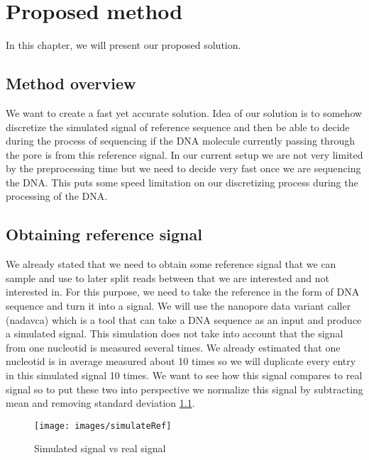 \chapter{Proposed method}

\label{kap:proposedMethod} %

In this chapter, we will present our proposed solution.

\section{Method overview}

We want to create a fast yet accurate solution. Idea of our solution is to somehow
discretize the simulated signal of reference sequence and then be able to decide
during the process of sequencing if the DNA molecule currently passing through the
pore is from this reference signal. In our current setup we are not very limited
by the preprocessing time but we need to decide very fast once we are sequencing
the DNA. This puts some speed limitation on our discretizing process during the
processing of the DNA.

\section{Obtaining reference signal}

We already stated that we need to obtain some reference signal that we
can sample and use to later split reads between that we are interested and not
interested in. For this purpose, we need to take the reference in the form of DNA sequence
and turn it into a signal. We will use the nanopore data
variant caller (nadavca) which is a tool that can take a DNA sequence as an input
and produce a simulated signal. This simulation does not take into account that
the signal from one nucleotid is measured several times. We already estimated
that one nucleotid is in average measured about 10 times so we will duplicate every
entry in this simulated signal 10 times. We want to see how this signal compares
to real signal so to put these two into perspective we normalize this signal by
subtracting mean and removing standard deviation \ref{obr:simVsReal}.

\begin{figure}
\centerline{\texttt{[image: images/simulateRef]}}
\caption[Hehe]{Simulated signal vs real signal}
\label{obr:simVsReal}
\end{figure}

